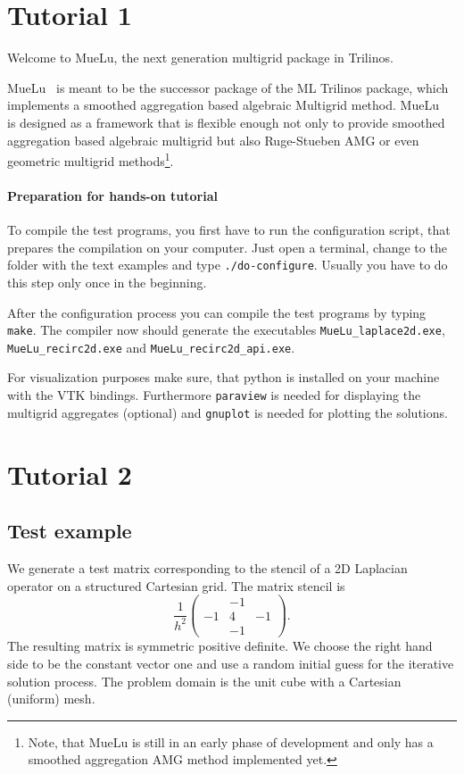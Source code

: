 \documentclass[12pt,a4paper]{article}
\author{Tobias Wiesner}
\newcommand{\MueLu}{MueLu}
\begin{document}
\section{Tutorial 1}
Welcome to \MueLu, the next generation multigrid package in Trilinos.

\MueLu~ is meant to be the successor package of the ML Trilinos package, which implements a smoothed aggregation based algebraic Multigrid method. \MueLu~ is designed as a framework that is flexible enough not only to provide smoothed aggregation based algebraic multigrid but also Ruge-Stueben AMG or even geometric multigrid methods\footnote{Note, that MueLu is still in an early phase of development and only has a smoothed aggregation AMG method implemented yet.}.


\paragraph{Preparation for hands-on tutorial}
To compile the test programs, you first have to run the configuration script, that prepares the compilation on your computer. Just open a terminal, change to the folder with the text examples and type \verb|./do-configure|. Usually you have to do this step only once in the beginning.

After the configuration process you can compile the test programs by typing \verb|make|. The compiler now should generate the executables \verb|MueLu_laplace2d.exe|, \verb|MueLu_recirc2d.exe| and \verb|MueLu_recirc2d_api.exe|.

For visualization purposes make sure, that python is installed on your machine with the VTK bindings. Furthermore \verb|paraview| is needed for displaying the multigrid aggregates (optional) and \verb|gnuplot| is needed for plotting the solutions.

\section{Tutorial 2}

\subsection{Test example}
We generate a test matrix corresponding to the stencil of a 2D Laplacian operator on a structured Cartesian grid. The matrix stencil is
\begin{displaymath}
\frac{1}{h^2}\begin{pmatrix} & -1 & \\ -1 & 4 & -1 \\ & -1 & \end{pmatrix}.
\end{displaymath}
The resulting matrix is symmetric positive definite. We choose the right hand side to be the constant vector one and use a random initial guess for the iterative solution process. The problem domain is the unit cube with a Cartesian (uniform) mesh.
\end{document}
